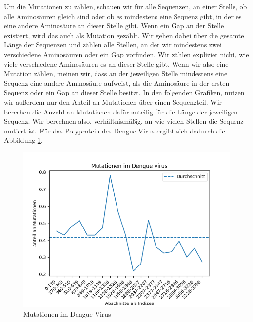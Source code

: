 \documentclass[german,version-2022-01]{uzl-thesis}
\begin{document}
Um die Mutationen zu z\"ahlen, schauen wir f\"ur alle Sequenzen, an einer Stelle, ob alle Aminos\"auren gleich sind oder ob es mindestens eine Sequenz gibt, in der es eine andere Aminos\"aure an dieser Stelle gibt. Wenn ein Gap an der Stelle existiert, wird das auch als Mutation gez\"ahlt. Wir gehen dabei \"uber die gesamte L\"ange der Sequenzen und z\"ahlen alle Stellen, an der wir mindestens zwei verschiedene Aminos\"auren oder ein Gap vorfinden. Wir z\"ahlen expliziet nicht, wie viele verschiedene Aminos\"auren es an dieser Stelle gibt. Wenn wir also eine Mutation z\"ahlen, meinen wir, dass an der jeweiligen Stelle mindestens eine Sequenz eine andere Aminos\"aure aufweist, als die Aminos\"aure in der ersten Sequenz oder ein Gap an dieser Stelle besitzt. In den folgenden Grafiken, nutzen wir au\ss{}erdem nur den Anteil an Mutationen \"uber einen Sequenzteil. Wir berechen die Anzahl an Mutationen daf\"ur anteilig f\"ur die L\"ange der jeweiligen Sequenz. Wir berechnen also, verh\"altnism\"a\ss{}ig, an wie vielen Stellen die Sequenz mutiert ist. F\"ur das Polyprotein des Dengue-Virus ergibt sich dadurch die Abbildung \ref{fig:Dengue_virus_mutations}. 
\begin{figure}[htpb]
  \centering
  \includegraphics[scale=0.75]{Images/Diagramm_Mutationen_im_Dengue_virus.png}
  \caption{Mutationen im Dengue-Virus}
  \label{fig:Dengue_virus_mutations}
\end{figure}
\end{document}
